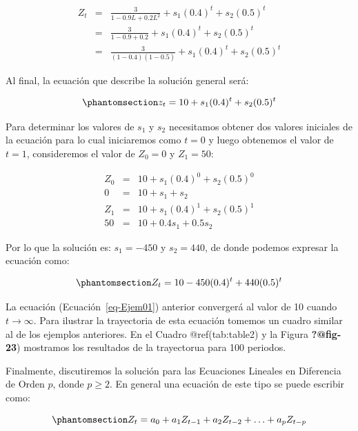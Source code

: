 \documentclass[
  a4paper,
]{article}
\begin{document}
\begin{eqnarray}
    Z_t & = & \frac{3}{1 - 0.9 L + 0.2 L^2} + s_1 (0.4)^t + s_2 (0.5)^t \nonumber \\
    & = & \frac{3}{1 - 0.9 + 0.2} + s_1 (0.4)^t + s_2 (0.5)^t \nonumber \\
    & = & \frac{3}{(1 - 0.4)(1 - 0.5)} + s_1 (0.4)^t + s_2 (0.5)^t \nonumber
\end{eqnarray}

Al final, la ecuación que describe la solución general será:

\begin{equation}\phantomsection\label{eq-Conver9}{
    z_t = 10 + s_1 (0.4)^t + s_2 (0.5)^t
}\end{equation}

Para determinar los valores de \(s_1\) y \(s_2\) necesitamos obtener dos
valores iniciales de la ecuación para lo cual iniciaremos como \(t = 0\)
y luego obtenemos el valor de \(t = 1\), consideremos el valor de
\(Z_0 = 0\) y \(Z_1 = 50\):

\begin{eqnarray*}
    Z_0 & = & 10 + s_1(0.4)^0  + s_2(0.5)^0 \\
    0 & = & 10 + s_1 + s_2 \\
    Z_1 & = & 10 + s_1(0.4)^1  + s_2(0.5)^1 \\
    50 & = & 10 + 0.4 s_1 + 0.5 s_2
\end{eqnarray*}

Por lo que la solución es: \(s_1 = -450\) y \(s_2 = 440\), de donde
podemos expresar la ecuación como:

\begin{equation}\phantomsection\label{eq-Ejem01}{
    Z_t = 10 - 450(0.4)^t + 440(0.5)^t
}\end{equation}

La ecuación (Ecuación~\ref{eq-Ejem01}) anterior convergerá al valor de
10 cuando \(t \rightarrow \infty\). Para ilustrar la trayectoria de esta
ecuación tomemos un cuadro similar al de los ejemplos anteriores. En el
Cuadro @ref(tab:table2) y la Figura \textbf{?@fig-23}) mostramos los
resultados de la trayectorua para 100 periodos.

Finalmente, discutiremos la solución para las Ecuaciones Lineales en
Diferencia de Orden \(p\), donde \(p \geq 2\). En general una ecuación
de este tipo se puede escribir como:

\begin{equation}\phantomsection\label{eq-EDOP}{
    Z_t = a_0 + a_1 Z_{t-1} + a_2 Z_{t-2} + \ldots + a_p Z_{t-p}
}\end{equation}
\end{document}
